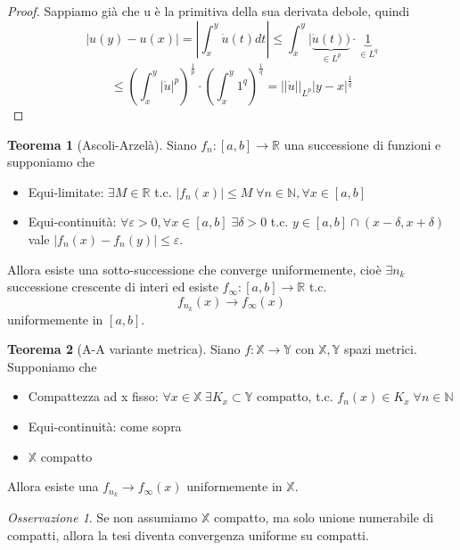 \documentclass[a4paper]{book}
\theoremstyle{definition}
\theoremstyle{remark}
\newtheorem{oss}{Osservazione}
\theoremstyle{definition}
\newtheorem{teo}{Teorema}
\newcommand{\bbx}{\mathbb{X}}
\newcommand{\bbr}{\mathbb{R}}
\newcommand{\bbn}{\mathbb{N}}
\begin{document}
\begin{proof}
	Sappiamo già che u è la primitiva della sua derivata debole, quindi $$|u(y)-u(x)| = |\int_x^y \dot{u}(t) dt| \le \int_x^y|\underbrace{\dot{u}(t))}_{\in L^p}\cdot \underbrace{1}_{\in L^q} $$ $$\le \left(\int_x^y |\dot{u}|^p\right)^\frac1p \cdot \left( \int_x^y 1^q \right)^\frac1q
	= ||\dot{u}||_{L^p}|y-x|^{\frac1q}$$
\end{proof}

\begin{teo}[Ascoli-Arzelà]
	Siano $f_n:[a,b]\to \bbr$ una successione di funzioni e supponiamo che 
	\begin{itemize}
		\item Equi-limitate: $\exists M \in\bbr$ t.c. $|f_n(x)|\le M \; \forall n \in \bbn, \forall x \in [a,b]$
		\item Equi-continuità: $\forall \varepsilon > 0, \forall x \in [a,b]\; \exists \delta >0$ t.c. $y \in [a,b]\cap(x-\delta, x + \delta)$ vale $|f_n(x) - f_n(y)| \le \varepsilon$.
	\end{itemize} 
	Allora esiste una sotto-successione che converge uniformemente, cioè $\exists n_k$ successione crescente di interi ed esiste $f_\infty:[a,b]\to \bbr$ t.c.
	$$f_{n_k}(x) \to f_\infty(x)$$ uniformemente in $[a,b]$.
\end{teo}

\begin{teo}[A-A variante metrica]
	Siano $f: \bbx \to \mathbb{Y}$ con $\bbx, \mathbb{Y}$ spazi metrici. Supponiamo che 
	\begin{itemize}
		\item Compattezza ad x fisso: $\forall x \in \bbx \; \exists K_x \subset \mathbb{Y}$ compatto, t.c. $f_n(x)\in K_x\; \forall n \in \bbn$
		\item Equi-continuità: come sopra
		\item $\bbx$ compatto
	\end{itemize}
	Allora esiste una $f_{n_k}\to f_\infty(x)$ uniformemente in $\bbx$.
\end{teo}

\begin{oss}
	Se non assumiamo $\bbx$ compatto, ma solo unione numerabile di compatti, allora la tesi diventa convergenza uniforme su compatti.
\end{oss}
\end{document}
